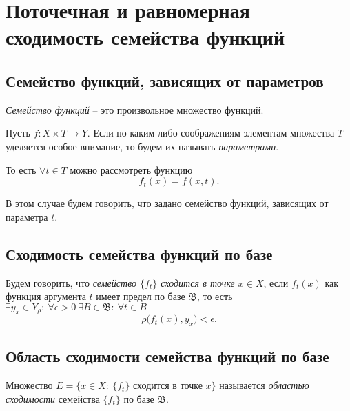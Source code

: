 \section{Поточечная и равномерная сходимость семейства функций}

\setcounter{subsection}{66}

\subsection{Семейство функций, зависящих от параметров}

\begin{definition}
    \emph{Семейство функций} -- это произвольное множество функций.

    Пусть $f:X\times T \rightarrow Y$. Если по каким-либо соображениям элементам множества $T$ уделяется особое внимание, то будем их называть \emph{параметрами}.

    То есть $\forall t \in T$ можно рассмотреть функцию
    \[
        f_t(x) = f(x,t).
    \]

    В этом случае будем говорить, что задано семейство функций, зависящих от параметра $t$.
\end{definition}

\newpage

\subsection{Сходимость семейства функций по базе}

\begin{definition}
    Будем говорить, что \emph{семейство $\{f_t\}$ сходится в точке $x \in X$}, если $f_t(x)$ как функция аргумента $t$ имеет предел по базе $\mathfrak{B}$, то есть $\exists y_x \in Y_\rho: \ \forall \epsilon > 0 \ \exists B \in \mathfrak{B}: \ \forall t \in B$
    \[
        \rho\big(f_t(x),y_x\big) < \epsilon.
    \]
\end{definition}

\subsection{Область сходимости семейства функций по базе}

\begin{definition}
    Множество $E = \big\{x \in X : \ \{f_t\}$ сходится в точке $x\big\}$ называется \emph{областью сходимости} семейства $\{f_t\}$ по базе $\mathfrak{B}$.
\end{definition}

